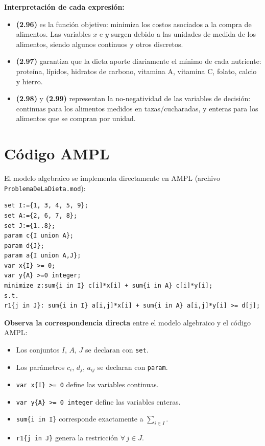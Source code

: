 \documentclass[12pt]{article}
\begin{document}
\begin{cajazul}
\textbf{Interpretaci\'on de cada expresi\'on:}
\begin{itemize}
    \item \textbf{(2.96)} es la funci\'on objetivo: minimiza los costos asociados a la compra de alimentos. Las variables $x$ e $y$ surgen debido a las unidades de medida de los alimentos, siendo algunos continuos y otros discretos.

    \item \textbf{(2.97)} garantiza que la dieta aporte diariamente el m\'inimo de cada nutriente: prote\'ina, l\'ipidos, hidratos de carbono, vitamina A, vitamina C, folato, calcio y hierro.

    \item \textbf{(2.98)} y \textbf{(2.99)} representan la no-negatividad de las variables de decisi\'on: continuas para los alimentos medidos en tazas/cucharadas, y enteras para los alimentos que se compran por unidad.
\end{itemize}
\end{cajazul}

\section{C\'odigo AMPL}

El modelo algebraico se implementa directamente en AMPL (archivo \texttt{ProblemaDeLaDieta.mod}):

\begin{lstlisting}[style=ampl]
set I:={1, 3, 4, 5, 9};
set A:={2, 6, 7, 8};
set J:={1..8};
param c{I union A};
param d{J};
param a{I union A,J};
var x{I} >= 0;
var y{A} >=0 integer;
minimize z:sum{i in I} c[i]*x[i] + sum{i in A} c[i]*y[i];
s.t.
r1{j in J}: sum{i in I} a[i,j]*x[i] + sum{i in A} a[i,j]*y[i] >= d[j];
\end{lstlisting}

\begin{cajanota}
\textbf{Observa la correspondencia directa} entre el modelo algebraico y el c\'odigo AMPL:
\begin{itemize}
    \item Los conjuntos $I$, $A$, $J$ se declaran con \texttt{set}.
    \item Los par\'ametros $c_i$, $d_j$, $a_{ij}$ se declaran con \texttt{param}.
    \item \texttt{var x\{I\} >= 0} define las variables continuas.
    \item \texttt{var y\{A\} >= 0 integer} define las variables enteras.
    \item \texttt{sum\{i in I\}} corresponde exactamente a $\sum_{i \in I}$.
    \item \texttt{r1\{j in J\}} genera la restricci\'on $\forall\, j \in J$.
\end{itemize}
\end{cajanota}
\end{document}
